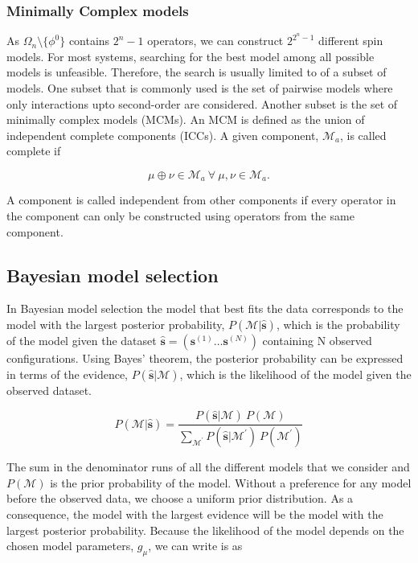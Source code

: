 \clearpage

\subsubsection{Minimally Complex models}

As $\Omega_n \setminus \{ \phi^0 \}$ contains $2^n-1$ operators, we can construct $2^{2^n-1}$ different spin models.
For most systems, searching for the best model among all possible models is unfeasible.
Therefore, the search is usually limited to of a subset of models.
One subset that is commonly used is the set of pairwise models where only interactions upto second-order are considered.
Another subset is the set of minimally complex models (MCMs).
An MCM is defined as the union of independent complete components (ICCs).
A given component, $\mathcal{M}_a$, is called complete if

\begin{equation}
    \mu \oplus \nu \in \mathcal{M}_a \: \forall \: \mu, \nu \in \mathcal{M}_a.
\end{equation}

\noindent
A component is called independent from other components if every operator in the component can only be constructed using operators from the same component.

\subsection{Bayesian model selection}

In Bayesian model selection the model that best fits the data corresponds to the model with the largest posterior probability, $P(\mathcal{M} | \mathbf{\hat{s}})$, which is the probability of the model given the dataset $\mathbf{\hat{s}} = (\mathbf{s}^{(1)} \dots \mathbf{s}^{(N)})$ containing N observed configurations.
Using Bayes' theorem, the posterior probability can be expressed in terms of the evidence, $P(\mathbf{\hat{s}}|\mathcal{M})$, which is the likelihood of the model given the observed dataset.

\begin{equation}
    P(\mathcal{M} | \mathbf{\hat{s}}) = \frac{P(\mathbf{\hat{s}}|\mathcal{M}) \: P(\mathcal{M}) }{\sum_{\mathcal{M}^\prime}P(\mathbf{\hat{s}}|\mathcal{M}^\prime) \: P(\mathcal{M}^\prime)}
\end{equation}

\noindent
The sum in the denominator runs of all the different models that we consider and $P(\mathcal{M})$ is the prior probability of the model.
Without a preference for any model before the observed data, we choose a uniform prior distribution.
As a consequence, the model with the largest evidence will be the model with the largest posterior probability.
Because the likelihood of the model depends on the chosen model parameters, $g_\mu$, we can write is as

